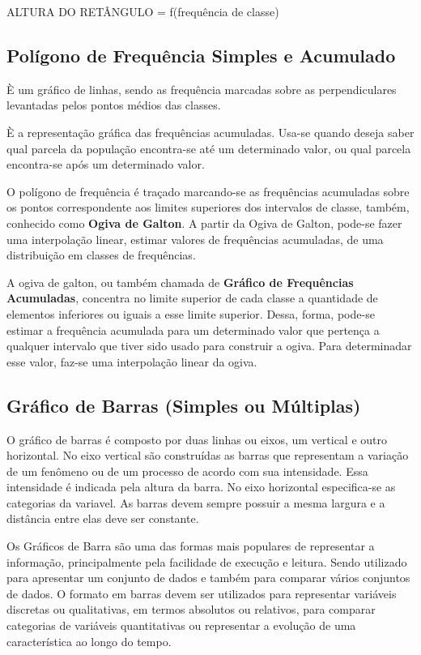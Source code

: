 ALTURA DO RETÂNGULO = f(frequência de classe)




\subsection{Polígono de Frequência Simples e Acumulado}

\inic È um gráfico de linhas, sendo as frequência marcadas sobre as
perpendiculares levantadas pelos pontos médios das classes.\vskip0.3cm

È a representação gráfica das frequências acumuladas. Usa-se
quando deseja saber qual parcela da população encontra-se até um
determinado valor, ou qual parcela encontra-se após um determinado
valor.\vskip0.3cm

O polígono de frequência é traçado marcando-se as frequências
acumuladas sobre os pontos correspondente aos limites superiores
dos intervalos de classe, também, conhecido como \textbf{Ogiva de
Galton}. A partir da Ogiva de Galton, pode-se fazer uma
interpolação linear, estimar valores de frequências acumuladas, de
uma distribuição em classes de frequências.\vskip0.3cm

A ogiva de galton, ou também chamada de \textbf{Gráfico de
Frequências Acumuladas}, concentra no limite superior de cada
classe a quantidade de elementos inferiores ou iguais a esse
limite superior. Dessa, forma, pode-se estimar a frequência
acumulada para um determinado valor que pertença a qualquer
intervalo que tiver sido usado para construir a ogiva. Para
determinadar esse valor, faz-se uma interpolação linear da ogiva.


\subsection{Gráfico de Barras (Simples ou Múltiplas)}

\inic O gráfico de barras é composto por duas linhas ou eixos, um
vertical e outro horizontal. No eixo vertical são construídas as
barras que representam a variação de um fenômeno ou de um processo
de acordo com sua intensidade. Essa intensidade é indicada pela
altura da barra. No eixo horizontal especifica-se as categorias da
variavel. As barras devem sempre possuir a mesma largura e a
distância entre elas deve ser constante.\vskip0.3cm

Os Gráficos de Barra são uma das formas mais populares de representar a informação, principalmente pela facilidade de execução e leitura. Sendo utilizado para apresentar um conjunto de dados e também para comparar vários conjuntos de dados. O formato em barras devem ser utilizados para representar variáveis discretas ou qualitativas, em termos absolutos ou relativos, para comparar categorias de variáveis quantitativas ou representar a evolução de uma característica ao longo do tempo.\vskip0.3cm

